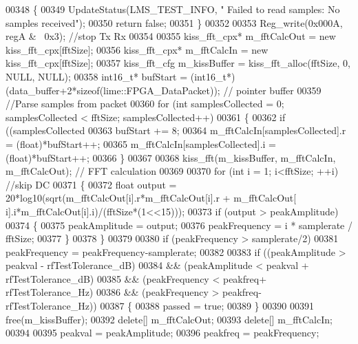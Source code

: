 \begin{DoxyCode}
{{{00348     \{
00349         UpdateStatus(LMS_TEST_INFO, \textcolor{stringliteral}{"  Failed to read samples: No samples received"});
00350         \textcolor{keywordflow}{return} \textcolor{keyword}{false};
00351     \}
00352 
00353     Reg\_write(0x000A, regA & ~0x3); \textcolor{comment}{//stop Tx Rx}
00354 
00355     kiss_fft_cpx* m\_fftCalcOut = \textcolor{keyword}{new} kiss_fft_cpx[fftSize];
00356     kiss_fft_cpx* m\_fftCalcIn = \textcolor{keyword}{new} kiss_fft_cpx[fftSize];
00357     kiss_fft_cfg m\_kissBuffer = kiss_fft_alloc(fftSize, 0, NULL, NULL);
00358     int16\_t* bufStart = (int16\_t*)(data\_buffer+2*\textcolor{keyword}{sizeof}(lime::FPGA_DataPacket)); \textcolor{comment}{// pointer buffer}
00359     \textcolor{comment}{//Parse samples from packet}
00360     \textcolor{keywordflow}{for} (\textcolor{keywordtype}{int} samplesCollected = 0; samplesCollected < fftSize; samplesCollected++)
00361     \{
00362         \textcolor{keywordflow}{if} ((samplesCollected%
00363             bufStart += 8;
00364         m\_fftCalcIn[samplesCollected].r = (float)*bufStart++;
00365         m\_fftCalcIn[samplesCollected].i = (float)*bufStart++;
00366     \}
00367 
00368     kiss_fft(m\_kissBuffer, m\_fftCalcIn, m\_fftCalcOut);    \textcolor{comment}{// FFT calculation}
00369 
00370     \textcolor{keywordflow}{for} (\textcolor{keywordtype}{int} i = 1; i<fftSize; ++i)                     \textcolor{comment}{//skip DC}
00371     \{
00372         \textcolor{keywordtype}{float} output = 20*log10(sqrt(m\_fftCalcOut[i].r*m\_fftCalcOut[i].r + m\_fftCalcOut[
      i].i*m\_fftCalcOut[i].i)/(fftSize*(1<<15)));
00373         \textcolor{keywordflow}{if} (output > peakAmplitude)
00374         \{
00375             peakAmplitude = output;
00376             peakFrequency = i * samplerate / fftSize;
00377         \}
00378     \}
00379 
00380     \textcolor{keywordflow}{if} (peakFrequency > samplerate/2)
00381         peakFrequency = peakFrequency-samplerate;
00382 
00383     \textcolor{keywordflow}{if} ((peakAmplitude > peakval - rfTestTolerance\_dB)
00384      && (peakAmplitude < peakval + rfTestTolerance\_dB)
00385      && (peakFrequency < peakfreq+ rfTestTolerance\_Hz)
00386      && (peakFrequency > peakfreq- rfTestTolerance\_Hz))
00387     \{
00388         passed = \textcolor{keyword}{true};
00389     \}
00390 
00391     free(m\_kissBuffer);
00392     \textcolor{keyword}{delete}[] m\_fftCalcOut;
00393     \textcolor{keyword}{delete}[] m\_fftCalcIn;
00394 
00395     peakval = peakAmplitude;
00396     peakfreq = peakFrequency;
}}}
\end{DoxyCode}
